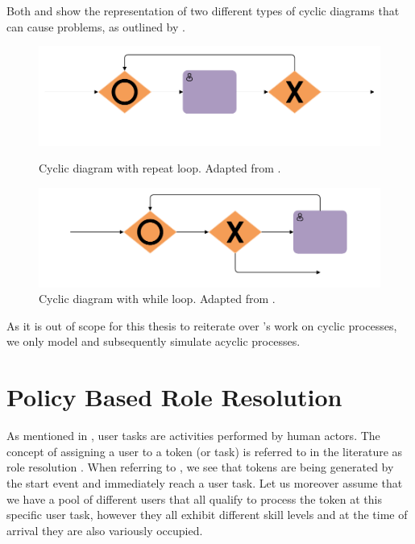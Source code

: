 Both  and  show the representation of two different types of cyclic diagrams that can cause problems, as outlined by \citet{Soerensen2005}.

\begin{figure}[!ht]
	\centering
	\begin{minipage}[b]{0.45\textwidth}
		\includegraphics[width=\textwidth]{img/repeat_loops}
		\caption{Cyclic diagram with repeat loop. Adapted from \citet[p. 12]{Soerensen2005}.}
		\label{fig:repeat_loops}
	\end{minipage}
	\hfill
	\begin{minipage}[b]{0.45\textwidth}
		\includegraphics[width=\textwidth]{img/while_loops}
		\caption{Cyclic diagram with while loop. Adapted from \citet[p. 12]{Soerensen2005}.}
		\label{fig:while_loops}
	\end{minipage}
\end{figure}

As it is out of scope for this thesis to reiterate over \citet{Soerensen2005}'s work on cyclic processes, we only model and subsequently simulate acyclic processes.

\section{Policy Based Role Resolution}
\label{sec:role_resolution_theory}

As mentioned in , user tasks are activities performed by human actors. The concept of assigning a user to a token (or task) is referred to in the literature as role resolution \citep{Zeng2005,Cheng2000}. When referring to , we see that tokens are being generated by the start event and immediately reach a user task. Let us moreover assume that we have a pool of different users that all qualify to process the token at this specific user task, however they all exhibit different skill levels and at the time of arrival they are also variously occupied. 

